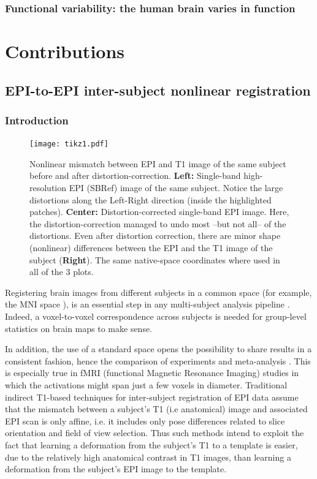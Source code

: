 \section{Functional variability: the human brain varies in function}

\part{Contributions}
\chapter{EPI-to-EPI inter-subject nonlinear registration}\label{Chapter_1_Section_1}
\section{Introduction}
\begin{figure}[!htbp]
     \texttt{[image: tikz1.pdf]}
\caption{Nonlinear mismatch between EPI and T1 image of
  the same subject before and after distortion-correction.
\textbf{Left:} Single-band high-resolution EPI (SBRef) image of the
same subject. Notice the large distortions along the Left-Right direction
(inside the highlighted patches). \textbf{Center:} Distortion-corrected
single-band EPI image. Here, the distortion-correction managed to undo
most --but not all-- of the distortions. Even after distortion
correction, there are minor shape (nonlinear) differences between the
EPI and the T1 image of the subject (\textbf{Right}). The same native-space
coordinates where used in all of the 3 plots.}
\label{fig:pb_fig}
\end{figure}
Registering brain images from different subjects in a common space
(for example, the MNI space \citep{pmid8126267,pmid9343592}), is an
essential step in any multi-subject analysis pipeline \citep{FristonBook}. Indeed, a
voxel-to-voxel correspondence across subjects is needed for
group-level statistics on brain maps to make sense.

In addition, the use of a standard space opens the possibility to share
results in a consistent fashion, hence the comparison of experiments
and meta-analysis \citep{pmid18985131,pmid25914639}.
This is especially true in fMRI (functional Magnetic Resonance Imaging)
studies in which the activations might span just a few voxels in diameter.
Traditional indirect T1-based techniques for inter-subject
registration of EPI data assume that the mismatch between a subject's
T1 (i.e anatomical) image and associated EPI scan is only affine,
i.e. it includes only pose differences related to slice orientation
and field of view selection. Thus such methods intend to exploit the
fact that learning a deformation from the subject's T1 to a template
is easier, due to the relatively high anatomical contrast in T1
images, than learning a deformation from the subject's EPI image to the
template.

